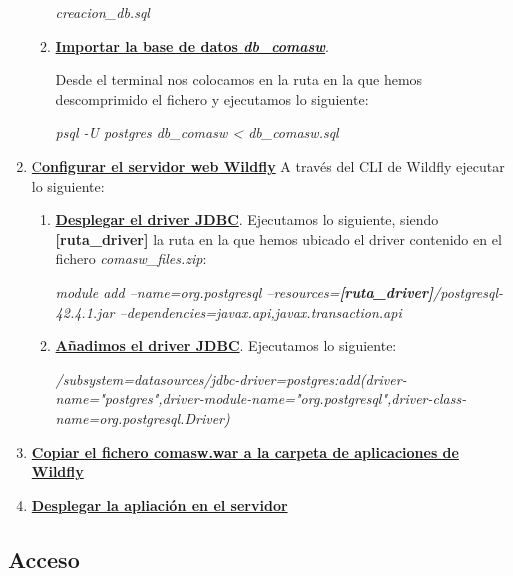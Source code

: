 \begin{enumerate}
\begin{enumerate}
\emph{creacion\_db.sql}\newline

	\item \underline{\textbf{Importar la base de datos \emph{\textbf{db\_comasw}}}}.\newline

Desde el terminal nos colocamos en la ruta en la que hemos descomprimido el fichero y ejecutamos lo siguiente:\newline

\emph{psql -U postgres db\_comasw < db\_comasw.sql} \newline

	\end{enumerate}
\item \underline{C\textbf{onfigurar el servidor web Wildfly}}\newline
A través del CLI de Wildfly ejecutar lo siguiente:

	\begin{enumerate}
	\item  \underline{\textbf{Desplegar el driver JDBC}}.\newline
Ejecutamos lo siguiente, siendo \textbf{[ruta\_driver]} la ruta en la que hemos ubicado el driver contenido en el fichero \emph{comasw\_files.zip}:

\emph{module add --name=org.postgresql --resources=\textbf{[ruta\_driver]}/postgresql-42.4.1.jar --dependencies=javax.api,javax.transaction.api}
\newline

	\item \underline{\textbf{Añadimos el driver JDBC}}.\newline
Ejecutamos lo siguiente:\newline

\emph{/subsystem=datasources/jdbc-driver=postgres:add(driver-name="postgres",driver-module-name="org.postgresql",driver-class-name=org.postgresql.Driver)}
\newline
	\end{enumerate}

\item \underline{\textbf{Copiar el fichero comasw.war a la carpeta de aplicaciones de Wildfly}}
\item \underline{\textbf{Desplegar la apliación en el servidor}}
\end{enumerate}


 
\subsection{Acceso}
\label{sub:acceso-administrador}
 
